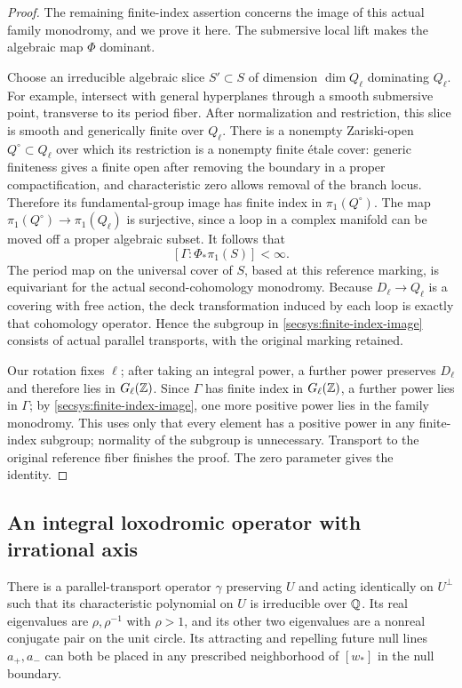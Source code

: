 \begin{proof}
The remaining finite-index assertion concerns the image of this
actual family monodromy, and we prove it here.  The submersive local
lift makes the algebraic map $\Phi$ dominant.

Choose an irreducible algebraic slice $S'\subset S$ of dimension
$\dim Q_\ell$ dominating $Q_\ell$.  For example, intersect with
general hyperplanes through a smooth submersive point, transverse to
its period fiber.  After normalization and restriction, this slice is
smooth and generically finite over $Q_\ell$.  There is a nonempty
Zariski-open $Q^\circ\subset Q_\ell$ over which its restriction is
a nonempty finite \'{e}tale cover: generic finiteness gives a finite
open after removing the boundary in a proper compactification, and
characteristic zero allows removal of the branch locus.
Therefore its fundamental-group image has finite index in
$\pi_1(Q^\circ)$.  The map
$\pi_1(Q^\circ)\to\pi_1(Q_\ell)$ is surjective, since a loop in a
complex manifold can be moved off a proper algebraic subset.
It follows that
\begin{equation}\label{secsys:finite-index-image}
       [\Gamma:\Phi_*\pi_1(S)]<\infty.
\end{equation}
The period map on the universal cover of $S$, based at this reference
marking, is equivariant for the actual second-cohomology monodromy.
Because $D_\ell\to Q_\ell$ is a
covering with free action, the deck transformation induced by each
loop is exactly that cohomology operator.  Hence the subgroup in
\eqref{secsys:finite-index-image} consists of actual parallel transports,
with the original marking retained.

Our rotation fixes $\ell$; after taking an integral power, a further
power preserves $D_\ell$ and therefore lies in $G_\ell(\mathbb Z)$.
Since $\Gamma$ has finite index in $G_\ell(\mathbb Z)$, a further power
lies in $\Gamma$; by \eqref{secsys:finite-index-image}, one more
positive power lies in the family monodromy.  This uses only that every element has a
positive power in any finite-index subgroup; normality of the subgroup
is unnecessary.  Transport to the original reference fiber finishes
the proof.  The zero parameter gives the identity.
\end{proof}

\subsection{An integral loxodromic operator with irrational axis}

\begin{lemma}\label{secsys:loxodromic}
There is a parallel-transport operator $\gamma$ preserving $U$ and
acting identically on $U^\perp$ such that its characteristic polynomial
on $U$ is irreducible over $\mathbb Q$.  Its real eigenvalues are
$\rho,\rho^{-1}$ with $\rho>1$, and its other two eigenvalues are a
nonreal conjugate pair on the unit circle.  Its attracting and repelling
future null lines $a_+,a_-$ can both be placed in any prescribed
neighborhood of $[w_*]$ in the null boundary.
\end{lemma}

